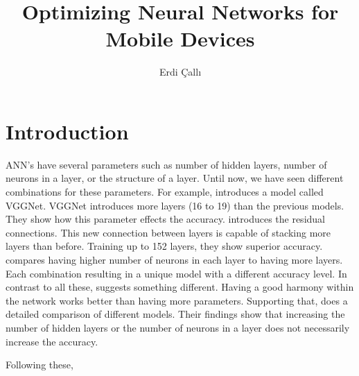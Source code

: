 \documentclass[a4paper,man,natbib]{apa6}
\title{Optimizing Neural Networks for Mobile Devices}
\author{Erdi \c{C}all{\i}}
\affiliation{Radboud University Nijmegen, Neurant}
\begin{document}
\maketitle
\section{Introduction}

ANN's have several parameters such as number of hidden layers, number of neurons in a layer, or the structure of a layer. Until now, we have seen different combinations for these parameters. For example, \cite{Simonyan:2014aa} introduces a model called VGGNet. VGGNet introduces more layers (16 to 19) than the previous models. They show how this parameter effects the accuracy. \cite{He:2015aa} introduces the residual connections. This new connection between layers is capable of stacking more layers than before. Training up to 152 layers, they show superior accuracy. \cite{Zagoruyko:2016aa} compares having higher number of neurons in each layer to having more layers. Each combination resulting in a unique model with a different accuracy level. In contrast to all these, \cite{Szegedy:2014aa} suggests something different. Having a good harmony within the network works better than having more parameters. Supporting that, \cite{Canziani:2016aa} does a detailed comparison of different models. Their findings show that increasing the number of hidden layers or the number of neurons in a layer does not necessarily increase the accuracy. 

Following these, %



\end{document}
